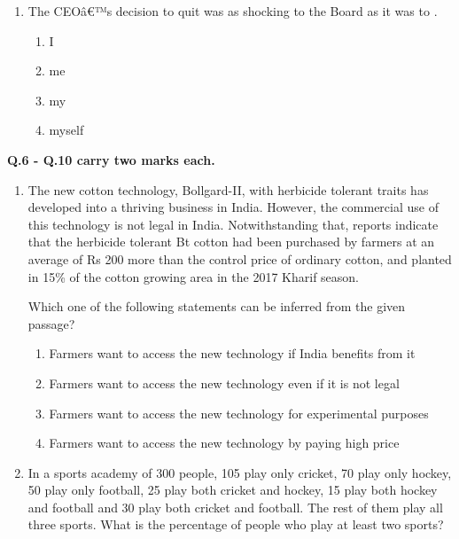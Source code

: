 \documentclass[12pt]{article}
\begin{document}
\begin{enumerate}[label = Q.\arabic*]
	\item The CEOâ€™s decision to quit was as shocking to the Board as it was to \underline{\hspace{1cm}}.
		\begin{multicols}{4}
			\begin{enumerate}[label=(\Alph*)]
				\item I
				\item me
				\item my
				\item myself
			\end{enumerate}
		\end{multicols}
\end{enumerate}

\noindent\textbf{Q.6 - Q.10 carry two marks each.}
\begin{enumerate}[start=6,label=Q.\arabic*]

	\item The new cotton technology, Bollgard-II, with herbicide tolerant traits has developed into a thriving business in India. However, the commercial use of this technology is not legal in India. Notwithstanding that, reports indicate that the herbicide tolerant Bt cotton had been purchased by farmers at an average of Rs 200 more than the control price of ordinary cotton, and planted in 15\% of the cotton growing area in the 2017 Kharif season.

		Which one of the following statements can be inferred from the given passage?

		\begin{enumerate}[label=(\Alph*)]
			\item Farmers want to access the new technology if India benefits from it 
			\item Farmers want to access the new technology even if it is not legal 
			\item Farmers want to access the new technology for experimental purposes 
			\item Farmers want to access the new technology by paying high price
		\end{enumerate}

	\item In a sports academy of 300 people, 105 play only cricket, 70 play only hockey, 50 play only football, 25 play both cricket and hockey, 15 play both hockey and football and 30 play both cricket and football. The rest of them play all three sports. What is the percentage of people who play at least two sports?


\end{enumerate}
\end{document}
